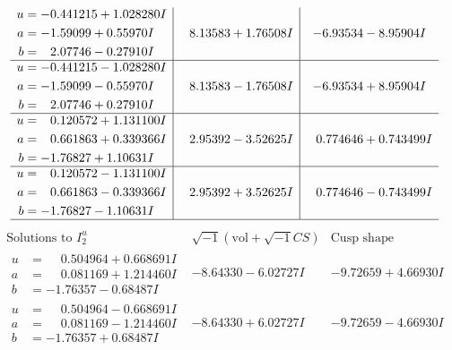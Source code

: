 \documentclass[1p]{elsarticle_modified}
\theoremstyle{definition}
\newcommand{\I}{\sqrt{-1}}
\begin{document}
$$\begin{array}{c|c|c}
\begin{aligned}
u &= -0.441215 + 1.028280 I \\
a &= -1.59099 + 0.55970 I \\
b &= \phantom{-}2.07746 - 0.27910 I\end{aligned}
 & \phantom{-}8.13583 + 1.76508 I & -6.93534 - 8.95904 I \\ \hline\begin{aligned}
u &= -0.441215 - 1.028280 I \\
a &= -1.59099 - 0.55970 I \\
b &= \phantom{-}2.07746 + 0.27910 I\end{aligned}
 & \phantom{-}8.13583 - 1.76508 I & -6.93534 + 8.95904 I \\ \hline\begin{aligned}
u &= \phantom{-}0.120572 + 1.131100 I \\
a &= \phantom{-}0.661863 + 0.339366 I \\
b &= -1.76827 + 1.10631 I\end{aligned}
 & \phantom{-}2.95392 - 3.52625 I & \phantom{-}0.774646 + 0.743499 I \\ \hline\begin{aligned}
u &= \phantom{-}0.120572 - 1.131100 I \\
a &= \phantom{-}0.661863 - 0.339366 I \\
b &= -1.76827 - 1.10631 I\end{aligned}
 & \phantom{-}2.95392 + 3.52625 I & \phantom{-}0.774646 - 0.743499 I\\
 \hline 
 \end{array}$$\newpage$$\begin{array}{c|c|c}  
\text{Solutions to }I^u_{2}& \I (\text{vol} + \sqrt{-1}CS) & \text{Cusp shape}\\
 \hline 
\begin{aligned}
u &= \phantom{-}0.504964 + 0.668691 I \\
a &= \phantom{-}0.081169 + 1.214460 I \\
b &= -1.76357 - 0.68487 I\end{aligned}
 & -8.64330 - 6.02727 I & -9.72659 + 4.66930 I \\ \hline\begin{aligned}
u &= \phantom{-}0.504964 - 0.668691 I \\
a &= \phantom{-}0.081169 - 1.214460 I \\
b &= -1.76357 + 0.68487 I\end{aligned}
 & -8.64330 + 6.02727 I & -9.72659 - 4.66930 I \\ \hline\begin{aligned}

\end{aligned}
\end{array}$$
\end{document}
